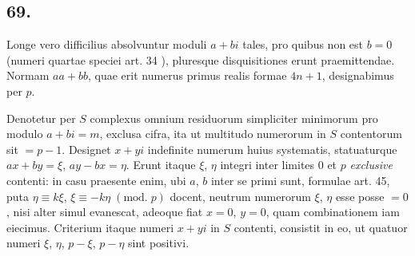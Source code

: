 \documentclass[twoside,12pt, showframe]{memoir}
\renewcommand{\pmod}[1]{\;(\textrm{mod.}\;#1)}
\begin{document}
\subsection*{69.}
 
Longe vero difficilius absolvuntur moduli \(a+b i\) tales, pro quibus non est \(b=0\) (numeri quartae speciei art. 34 ), pluresque disquisitiones erunt praemittendae. Normam \(a a+b b\), quae erit numerus primus realis formae \(4 n+1\), designabimus per \(p\).
 
Denotetur per \({S}\) complexus omnium residuorum simpliciter minimorum pro modulo \(a+b i=m\), exclusa cifra, ita ut multitudo numerorum in \(S\) contentorum sit \(=p-1\). Designet \(x+y i\) indefinite numerum huius systematis, statuaturque \(a x+b y=\xi\), \(a y-b x=\eta\). Erunt itaque \(\xi\), \(\eta\) integri inter limites \(0\) et \(p\) \textit{exclusive} contenti: in casu praesente enim, ubi \(a\), \(b\) inter se primi sunt, formulae art. 45, puta \(\eta \equiv k \xi\), \(\xi \equiv-k \eta\pmod{p}\) docent, neutrum numerorum \(\xi\), \(\eta\) esse posse \(=0\), nisi alter simul evanescat, adeoque fiat \(x=0\), \(y=0\), quam combinationem iam eiecimus. Criterium itaque numeri \(x+y i\) in \(S\) contenti, consistit in eo, ut quatuor numeri \(\xi\), \(\eta\), \(p-\xi\), \(p-\eta\) sint positivi.
\end{document}

